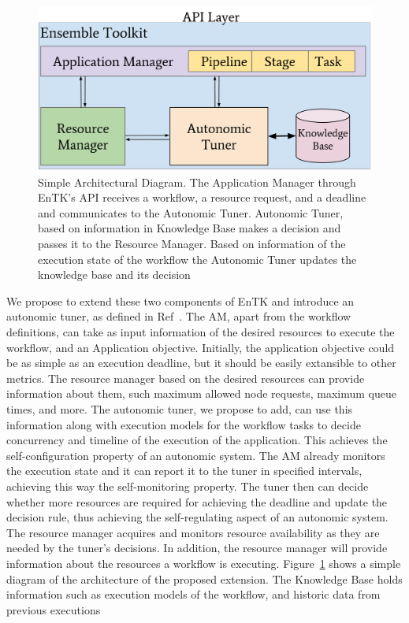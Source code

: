 \begin{figure}[t]
    \centering
    \includegraphics[width=.95\textwidth]{./AutonomicSubsystem.pdf}
    \caption{Simple Architectural Diagram. The Application Manager through 
        EnTK's API receives a workflow, a resource request, and a deadline and 
        communicates to the Autonomic Tuner. Autonomic Tuner, based on information 
        in Knowledge Base makes a decision and passes it to the Resource Manager.
        Based on information of the execution state of the workflow the Autonomic
        Tuner updates the knowledge base and its decision}\label{fig:architecture}
\end{figure}

We propose to extend these two components of EnTK and introduce an autonomic 
tuner, as defined in Ref~\cite{jha2009self}. The AM, apart from the workflow 
definitions, can take as input information of the desired resources to execute 
the workflow, and an Application objective. Initially, the application objective
could be as simple as an execution deadline, but it should be easily extansible to other
metrics. The resource manager based 
on the desired resources can provide information about them, such maximum allowed 
node requests, maximum queue times, and more. The autonomic tuner, we propose 
to add, can use this information along with execution models for the workflow 
tasks to decide concurrency and timeline of the execution of 
the application. This achieves the self-configuration property of an autonomic 
system. The AM already monitors the execution state and it can report it to the 
tuner in specified intervals, achieving this way the self-monitoring property. 
The tuner then can decide whether more resources are required for achieving the 
deadline and update the decision rule, thus achieving the self-regulating aspect 
of an autonomic system. The resource manager acquires and monitors resource 
availability as they are needed by the tuner's decisions. In addition, the resource manager
will provide information about the resources a workflow is executing. Figure~\ref{fig:architecture} shows a simple diagram of the 
architecture of the proposed extension. The Knowledge Base holds information such as 
execution models of the workflow, and historic data from previous executions

